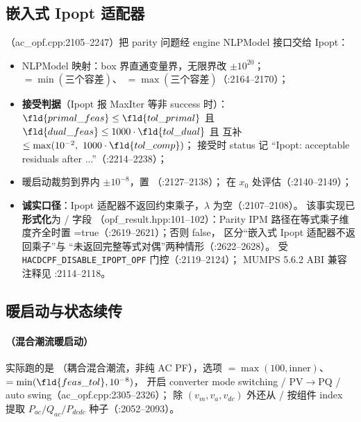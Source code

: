 \subsection{嵌入式 Ipopt 适配器}
（ac\_opf.cpp:2105--2247）把 parity 问题经
engine NLPModel 接口交给 Ipopt：
\begin{itemize}
  \item NLPModel 映射：box 界直通变量界，无限界改 $\pm10^{20}$；
        $=\min(\text{三个容差})$、
        $=\max(\text{三个容差})$（:2164--2170）；
  \item \textbf{接受判据}（Ipopt 报 MaxIter 等非 success 时）：
        $\fld{primal\_feas}\le\fld{tol\_primal}$ 且
        $\fld{dual\_feas}\le1000\cdot\fld{tol\_dual}$ 且
        互补 $\le\max(10^{-2},\ 1000\cdot\fld{tol\_comp})$；
        接受时 status 记 ``Ipopt: acceptable residuals after ...''（:2214--2238）；
  \item 暖启动裁剪到界内 $\pm10^{-8}$，置 （:2127--2138）；
         在 $x_0$ 处评估（:2140--2149）；
  \item \textbf{诚实口径}：Ipopt 适配器不返回约束乘子，$\lambda$ 为空（:2107--2108）。
        该事实现已\textbf{形式化}为 / 字段
        （opf\_result.hpp:101--102）：Parity IPM 路径在等式乘子维度齐全时置
        =true（:2619--2621）；否则 false，
         区分``嵌入式 Ipopt 适配器不返回乘子''与
        ``未返回完整等式对偶''两种情形（:2622--2628）。
        受 \texttt{HACDCPF\_DISABLE\_IPOPT\_OPF} 门控（:2119--2124）；
        MUMPS 5.6.2 ABI 兼容注释见 :2114--2118。
\end{itemize}

\subsection{暖启动与状态续传}
\paragraph{（混合潮流暖启动）}
实际跑的是 （耦合混合潮流，非纯 AC PF），选项
$=\max(100,\text{inner})$、$=\min(\fld{feas\_tol},10^{-8})$，
开启 converter mode switching / PV$\to$PQ / auto swing（ac\_opf.cpp:2305--2326）；
除 $(v_m,v_a,v_{dc})$ 外还从 /
按组件 index 提取 $P_{ac}/Q_{ac}/P_{dcdc}$ 种子（:2052--2093）。

